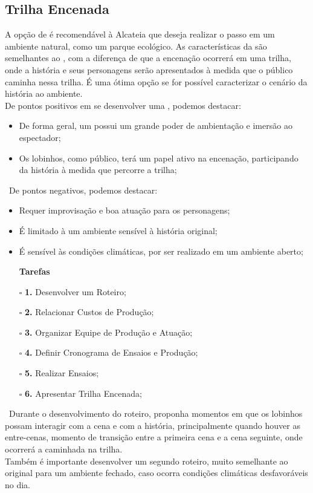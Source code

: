 		\subsection[Trilha Encenada]{Trilha Encenada}
		\label{subsec:sugestoes_encenacao_trilhaEncenada}
			A opção de  é recomendável à Alcateia que deseja realizar o passo em um ambiente natural, como um parque ecológico. As características da  são semelhantes ao , com a diferença de que a encenação ocorrerá em uma trilha, onde a história e seus personagens serão apresentados à medida que o público caminha nessa trilha. É uma ótima opção se for possível caracterizar o cenário da história ao ambiente.
			\\ \indent De pontos positivos em se desenvolver uma , podemos destacar:
			\begin{itemize}
				\item{De forma geral, um  possui um grande poder de ambientação e imersão ao espectador;}
				\item{Os lobinhos, como público, terá um papel ativo na encenação, participando da história à medida que percorre a trilha;}
			\end{itemize}
			\ \indent De pontos negativos, podemos destacar:
			\begin{itemize}
				\item{Requer improvisação e boa atuação para os personagens;}
				\item{É limitado à um ambiente sensível à história original;}
				\item{É sensível às condições climáticas, por ser realizado em um ambiente aberto;}
			\end{itemize}
			\begin{itemize}
				\item[]{\large{\textbf{Tarefas}}}
				\item[\LARGE{$\square$}]{\textbf{1.} Desenvolver um Roteiro;}
				\item[\LARGE{$\square$}]{\textbf{2.} Relacionar Custos de Produção;}
				\item[\LARGE{$\square$}]{\textbf{3.} Organizar Equipe de Produção e Atuação;}
				\item[\LARGE{$\square$}]{\textbf{4.} Definir Cronograma de Ensaios e Produção;}
				\item[\LARGE{$\square$}]{\textbf{5.} Realizar Ensaios;}
				\item[\LARGE{$\square$}]{\textbf{6.} Apresentar Trilha Encenada;}
			\end{itemize}
			\ \indent Durante o desenvolvimento do roteiro, proponha momentos em que os lobinhos possam interagir com a cena e com a história, principalmente quando houver as entre-cenas, momento de transição entre a primeira cena e a cena seguinte, onde ocorrerá a caminhada na trilha.
			\\ \indent Também é importante desenvolver um segundo roteiro, muito semelhante ao original para um ambiente fechado, caso ocorra condições climáticas desfavoráveis no dia.